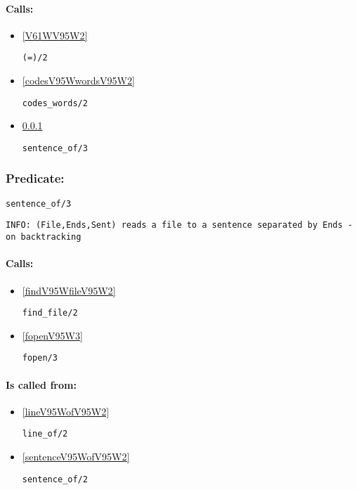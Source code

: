 \paragraph{Calls:} 
\begin{itemize}
\item \ref{V61WV95W2} 
\begin{verbatim}
(=)/2
\end{verbatim}

\item \ref{codesV95WwordsV95W2} 
\begin{verbatim}
codes_words/2
\end{verbatim}

\item \ref{sentenceV95WofV95W3} 
\begin{verbatim}
sentence_of/3
\end{verbatim}

\end{itemize}

\subsubsection{Predicate:} \label{sentenceV95WofV95W3}

\begin{verbatim}
sentence_of/3
\end{verbatim}

{\small \begin{verbatim}
INFO: (File,Ends,Sent) reads a file to a sentence separated by Ends - on backtracking

\end{verbatim}}
\paragraph{Calls:} 
\begin{itemize}
\item \ref{findV95WfileV95W2} 
\begin{verbatim}
find_file/2
\end{verbatim}

\item \ref{fopenV95W3} 
\begin{verbatim}
fopen/3
\end{verbatim}

\end{itemize}
\paragraph{Is called from:} 
\begin{itemize}
\item \ref{lineV95WofV95W2} 
\begin{verbatim}
line_of/2
\end{verbatim}

\item \ref{sentenceV95WofV95W2} 
\begin{verbatim}
sentence_of/2
\end{verbatim}

\end{itemize}


